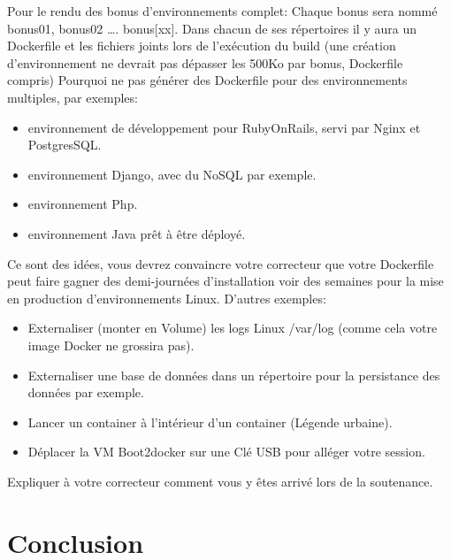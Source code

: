 \documentclass{42}
\begin{document}
Pour le rendu des bonus d'environnements complet:
\newline
Chaque bonus sera nommé bonus01, bonus02 …. bonus[xx].
\newline
\newline
Dans chacun de ses répertoires il y aura un Dockerfile et les fichiers joints lors de l’exécution du build (une création d'environnement ne devrait pas dépasser les 500Ko par bonus, Dockerfile compris)
\newline
\newline
Pourquoi ne pas générer des Dockerfile pour des environnements multiples, par exemples:
\newline
\begin{itemize}
	\item environnement de développement pour RubyOnRails, servi par Nginx et PostgresSQL.
	\item environnement Django, avec du NoSQL par exemple.
	\item environnement Php.
	\item environnement Java prêt à être déployé.
\end{itemize}
Ce sont des idées, vous devrez convaincre votre correcteur que votre Dockerfile peut faire gagner des demi-journées d’installation voir des semaines pour la mise en production d'environnements Linux.
\newline
\newline
D’autres exemples:
\newline
\begin{itemize}
	\item Externaliser (monter en Volume) les logs Linux /var/log (comme cela votre image Docker ne grossira pas).
	\item Externaliser une base de données dans un répertoire pour la persistance des données par exemple.
	\item Lancer un container à l'intérieur d’un container (Légende urbaine).
	\item Déplacer la VM Boot2docker sur une Clé USB   pour alléger votre session.
\end{itemize}

Expliquer à votre correcteur comment vous y êtes arrivé lors de la soutenance.

	\newpage

\chapter{Conclusion}
\end{document}
